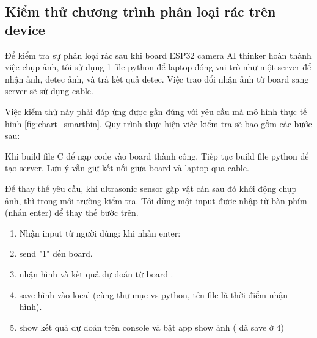 \subsection{Kiểm thử chương trình phân loại rác trên device}
Để kiểm tra sự phân loại rác sau khi board ESP32 camera AI thinker hoàn thành việc chụp ảnh, tôi sử dụng 1 file python để laptop đóng vai trò như một server để nhận ảnh, detec ảnh, và trả kết quả detec. Việc trao đổi nhận ảnh từ board sang server sẽ sử dụng cable. 

Việc kiểm thử này phải đáp ứng được gần đúng với yêu cầu mà mô hình thực tế hình \ref{fig:chart_smartbin}. Quy trình thực hiện viêc kiểm tra sẽ bao gồm các bước sau:

Khi build file C để nạp code vào board thành công. Tiếp tục build file python để tạo server. Lưu ý vẫn giữ kết nối giữa board và laptop qua cable.

Để thay thế yêu cầu, khi ultrasonic sensor gặp vật cản sau đó khởi động chụp ảnh, thì trong môi trường kiểm tra. Tôi dùng một input được nhập từ bàn phím (nhấn enter) để thay thế bước trên. 
\begin{enumerate}
    \item Nhận input từ người dùng: khi nhấn enter: 
    \item send "1" đến  board.
    \item nhận hình và kết quả dự đoán từ board .
    \item save hình vào local (cùng thư mục vs python, tên file là thời điểm nhận hình).
    \item show kết quả dự đoán trên console và bật app show ảnh ( đã save ở 4)
\end{enumerate}

